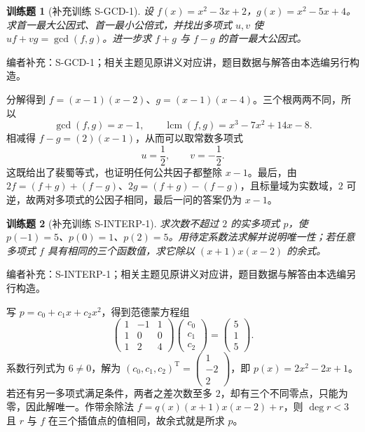 \documentclass[12pt,fontset=fandol]{ctexart}
\newtheorem{exercise}{训练题}[section]
\begin{document}
\begin{exercise}[补充训练 S-GCD-1]\label{prob:S-GCD-1}
设 $f(x)=x^{2}-3x+2$，$g(x)=x^{2}-5x+4$。求首一最大公因式、首一最小公倍式，并找出多项式 $u,v$ 使 $uf+vg=\gcd(f,g)$。进一步求 $f+g$ 与 $f-g$ 的首一最大公因式。
\end{exercise}
\noindent 编者补充：S-GCD-1；相关主题见原讲义对应讲，题目数据与解答由本选编另行构造。
\begin{solve}
分解得到 $f=(x-1)(x-2)$、$g=(x-1)(x-4)$。三个根两两不同，所以
\[\gcd(f,g)=x-1,\qquad\operatorname{lcm}(f,g)=x^{3}-7x^{2}+14x-8.\]
相减得 $f-g=(2)(x-1)$，从而可以取常数多项式
\[u=\frac{1}{2},\qquad v=-\frac{1}{2}.\]
这既给出了裴蜀等式，也证明任何公共因子都整除 $x-1$。最后，由 $2f=(f+g)+(f-g)$、$2g=(f+g)-(f-g)$，且标量域为实数域，$2$ 可逆，故两对多项式的公因子相同，最后一问的答案仍为 $x-1$。
\end{solve}

\begin{exercise}[补充训练 S-INTERP-1]\label{prob:S-INTERP-1}
求次数不超过 $2$ 的实多项式 $p$，使 $p(-1)=5$、$p(0)=1$、$p(2)=5$。用待定系数法求解并说明唯一性；若任意多项式 $f$ 具有相同的三个函数值，求它除以 $(x+1)x(x-2)$ 的余式。
\end{exercise}
\noindent 编者补充：S-INTERP-1；相关主题见原讲义对应讲，题目数据与解答由本选编另行构造。
\begin{solve}
写 $p=c_0+c_1x+c_2x^2$，得到范德蒙方程组
\[\begin{pmatrix}1&-1&1\\1&0&0\\1&2&4\end{pmatrix}\begin{pmatrix}c_0\\c_1\\c_2\end{pmatrix}=\begin{pmatrix}5\\1\\5\end{pmatrix}.\]
系数行列式为 $6\ne0$，解为 $(c_0,c_1,c_2)^{\mathrm T}=\begin{pmatrix}1\\-2\\2\end{pmatrix}$，即 $p(x)=2x^{2}-2x+1$。若还有另一多项式满足条件，两者之差次数至多 $2$，却有三个不同零点，只能为零，因此解唯一。作带余除法 $f=q(x)(x+1)x(x-2)+r$，则 $\deg r<3$ 且 $r$ 与 $f$ 在三个插值点的值相同，故余式就是所求 $p$。
\end{solve}
\end{document}
